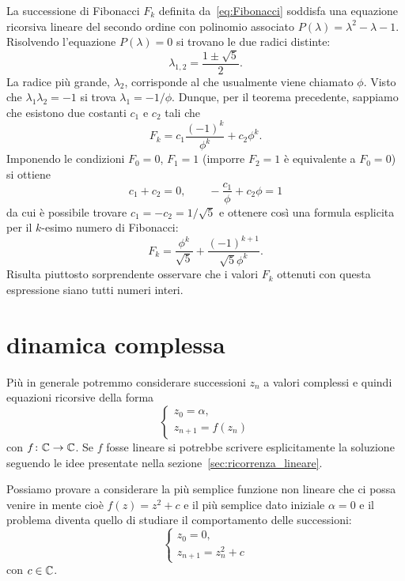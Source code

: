 \begin{example}
%
%
La successione di Fibonacci $F_k$ definita da~\eqref{eq:Fibonacci}
soddisfa una equazione ricorsiva lineare del secondo ordine con polinomio associato
$P(\lambda) = \lambda^2 - \lambda - 1$. Risolvendo l'equazione $P(\lambda)=0$
si trovano le due radici distinte:
\[
  \lambda_{1,2} = \frac{1 \pm \sqrt{5}}{2}.
\]
La radice più grande, $\lambda_2$, corrisponde al
 che usualmente viene chiamato $\phi$.
\index{$\phi$}%
Visto che $\lambda_1 \lambda_2 = -1$ si trova $\lambda_1 = -1/\phi$.
Dunque, per il teorema precedente, sappiamo che esistono due costanti $c_1$ e
$c_2$ tali che
\[
  F_k = c_1 \frac{(-1)^k}{\phi^k} + c_2 \phi^k .
\]
Imponendo le condizioni $F_0=0$, $F_1=1$ (imporre $F_2 = 1$ è equivalente a $F_0=0$)
si ottiene
\[
  c_1 + c_2 = 0, \qquad - \frac{c_1}{\phi} + c_2 \phi  = 1
\]
da cui è possibile trovare $c_1 = - c_2 = 1/\sqrt{5}$ e ottenere
così
una formula esplicita per il $k$-esimo numero di Fibonacci:
\[
  F_k = \frac{\phi^k}{\sqrt 5} + \frac{(-1)^{k+1}}{\sqrt 5\phi^k}.
\]
Risulta piuttosto sorprendente osservare che i valori $F_k$ ottenuti
con questa espressione siano tutti numeri interi.
\end{example}

\section{dinamica complessa}
\label{sec:mandelbrot}

Più in generale potremmo considerare successioni $z_n$ a valori complessi
e quindi equazioni ricorsive della forma
\[
  \begin{cases}
    z_0 = \alpha, \\
    z_{n+1} = f(z_n)
  \end{cases}
\]
con $f\colon \mathbb C \to \mathbb C$.
Se $f$ fosse lineare si potrebbe scrivere esplicitamente la soluzione
seguendo le idee presentate nella sezione~\ref{sec:ricorrenza_lineare}.

Possiamo provare a considerare la più semplice funzione non lineare che ci possa
venire in mente cioè $f(z) = z^2 + c$ e il più semplice dato iniziale $\alpha = 0$
e il problema diventa quello di studiare il comportamento delle successioni:
\begin{equation}\label{eq:mandelbrot}
  \begin{cases}
    z_0 = 0, \\
    z_{n+1} = z_n^2 + c
  \end{cases}
\end{equation}
con $c\in \mathbb C$.


